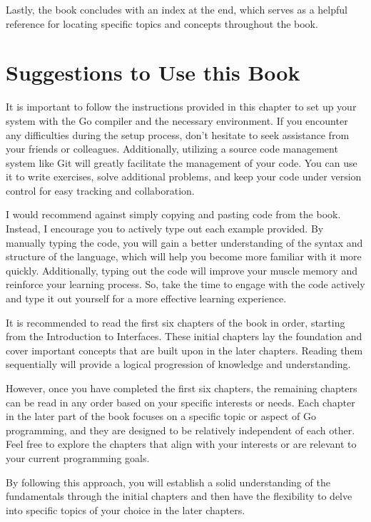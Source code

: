 Lastly, the book concludes with an index at the end, which serves as a helpful
reference for locating specific topics and concepts throughout the book.

\section{Suggestions to Use this Book}

It is important to follow the instructions provided in this chapter to set up
your system with the Go compiler and the necessary environment. If you encounter
any difficulties during the setup process, don't hesitate to seek assistance
from your friends or colleagues. Additionally, utilizing a source code
management system like Git will greatly facilitate the management of your code.
You can use it to write exercises, solve additional problems, and keep your code
under version control for easy tracking and collaboration.

I would recommend against simply copying and pasting code from the book.
Instead, I encourage you to actively type out each example provided. By manually
typing the code, you will gain a better understanding of the syntax and
structure of the language, which will help you become more familiar with it more
quickly. Additionally, typing out the code will improve your muscle memory and
reinforce your learning process. So, take the time to engage with the code
actively and type it out yourself for a more effective learning experience.

It is recommended to read the first six chapters of the book in order, starting
from the Introduction to Interfaces. These initial chapters lay the foundation
and cover important concepts that are built upon in the later chapters. Reading
them sequentially will provide a logical progression of knowledge and
understanding.

However, once you have completed the first six chapters, the remaining chapters
can be read in any order based on your specific interests or needs. Each chapter
in the later part of the book focuses on a specific topic or aspect of Go
programming, and they are designed to be relatively independent of each other.
Feel free to explore the chapters that align with your interests or are relevant
to your current programming goals.

By following this approach, you will establish a solid understanding of the
fundamentals through the initial chapters and then have the flexibility to delve
into specific topics of your choice in the later chapters.

